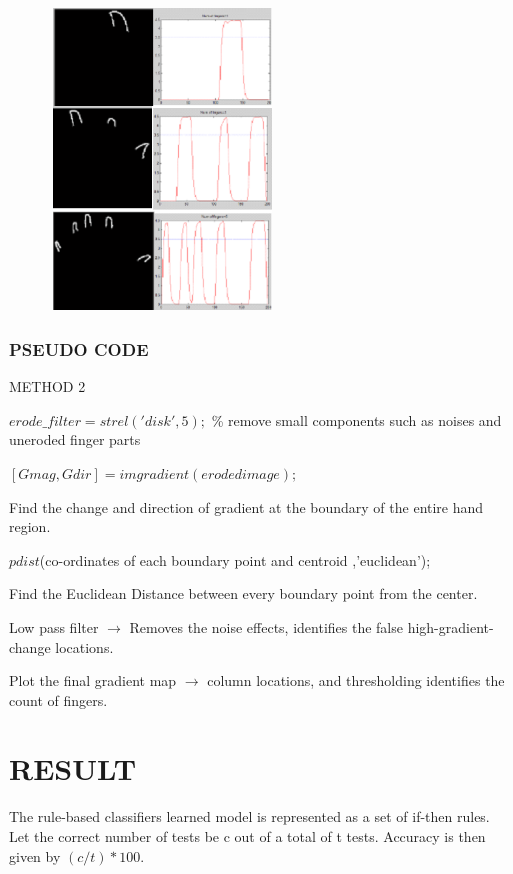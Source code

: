 \documentclass[conference]{IEEEtran}
\begin{document}
\begin{figure}[h!]
	\centering
	\includegraphics[width = 6cm, height = 8cm]{method2_2}
\end{figure}


\subsubsection{PSEUDO CODE}
METHOD 2

$erode\_filter= strel('disk',5);$ \% remove small components such as noises and uneroded finger parts
 
$[Gmag, Gdir] = imgradient(eroded image); $

Find the change and direction of gradient at the boundary of the entire hand region. 

$pdist$(co-ordinates of each boundary point and centroid ,'euclidean');

Find the Euclidean Distance between every boundary point from the center.

Low pass filter $\rightarrow$ Removes the noise effects, identifies the false high-gradient-change locations.

Plot the final gradient map $\rightarrow$ column locations, and thresholding identifies the count of fingers.

\section{RESULT}
The rule-based classifiers learned model is represented as a set of if-then rules. Let the correct number of tests be c out of a total of t tests.
Accuracy is then given by $(c/t)*100$.
\end{document}
